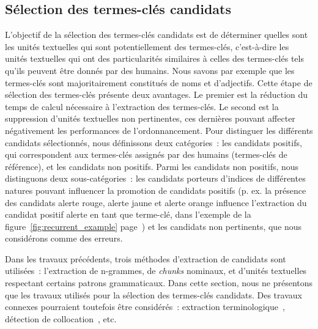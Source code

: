   \subsection{Sélection des termes-clés candidats}
  \label{subsec:extraction_de_termes_cles_candidats}
    L'objectif de la sélection des termes-clés candidats est de déterminer
    quelles sont les unités textuelles qui sont potentiellement des termes-clés,
    c'est-à-dire les unités textuelles qui ont des particularités similaires à
    celles des termes-clés tels qu'ils peuvent être donnés par des humains. Nous
    savons par exemple que les termes-clés sont majoritairement constitués de
    noms et d'adjectifs. Cette étape de sélection des termes-clés présente deux
    avantages. Le premier est la réduction du temps de calcul nécessaire à
    l'extraction des  termes-clés. Le second est la suppression d'unités
    textuelles non pertinentes, ces dernières pouvant affecter négativement les
    performances de l'ordonnancement. Pour distinguer les différents candidats
    sélectionnés, nous définissons deux catégories~: les candidats positifs, qui
    correspondent aux termes-clés assignés par des humains (termes-clés de
    référence), et les candidats non positifs. Parmi les candidats non positifs,
    nous distinguons deux sous-catégories~: les candidats porteurs d'indices de
    différentes natures pouvant influencer la promotion de candidats positifs
    (p. ex. la présence des candidats \og{}alerte rouge\fg{}, \og{}alerte
    jaune\fg{} et \og{}alerte orange\fg{} influence l'extraction du candidat
    positif \og{}alerte\fg{} en tant que terme-clé, dans l'exemple de la
    figure~\ref{fig:recurrent_example} page~\pageref{fig:recurrent_example}) et
    les candidats non pertinents, que nous considérons comme des erreurs.

    Dans les travaux précédents, trois méthodes d'extraction de candidats sont
    utilisées~: l'extraction de n-grammes, de \textit{chunks} nominaux, et d'unités
    textuelles respectant certains patrons grammaticaux. Dans cette section,
    nous ne présentons que les travaux utilisés pour la sélection des
    termes-clés candidats. Des travaux connexes pourraient toutefois être
    considérés~: extraction
    terminologique~\cite{castellvi2001automatictermdetection}, détection de
    collocation~\cite{pearce2002collocationdetection}, etc.

